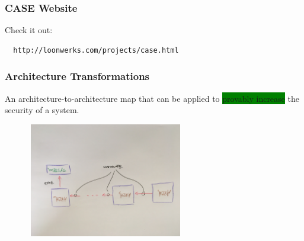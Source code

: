 \documentclass{beamer}
\newcommand{\gemph}[1]{\colorbox{green}{#1}}
\begin{document}
\begin{frame}[fragile]\frametitle{CASE Website}

Check it out:

\begin{verbatim}
  http://loonwerks.com/projects/case.html
\end{verbatim}

\end{frame}


\begin{frame}\frametitle{Architecture Transformations}

An architecture-to-architecture map that can be applied to
\gemph{provably increase} the security of a system.

\vspace*{4mm}

\includegraphics[width=90mm,height=50mm]{arch-trans.jpg}
\end{frame}
\end{document}
